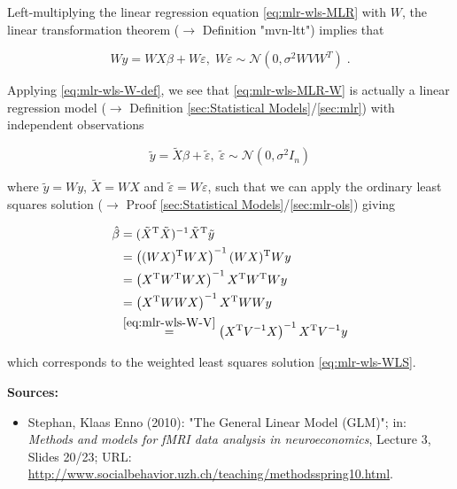 \documentclass[a4paper,12pt,twoside]{book}
\begin{document}
Left-multiplying the linear regression equation \eqref{eq:mlr-wls-MLR} with $W$, the linear transformation theorem ($\rightarrow$ Definition "mvn-ltt") implies that

\begin{equation} \label{eq:mlr-wls-MLR-W}
Wy = WX\beta + W\varepsilon, \; W\varepsilon \sim \mathcal{N}(0, \sigma^2 W V W^T) \; .
\end{equation}

Applying \eqref{eq:mlr-wls-W-def}, we see that \eqref{eq:mlr-wls-MLR-W} is actually a linear regression model ($\rightarrow$ Definition \ref{sec:Statistical Models}/\ref{sec:mlr}) with independent observations

\begin{equation} \label{eq:mlr-wls-MLR-W-dev}
\tilde{y} = \tilde{X}\beta + \tilde{\varepsilon}, \; \tilde{\varepsilon} \sim \mathcal{N}(0, \sigma^2 I_n)
\end{equation}

where $\tilde{y} = Wy$, $\tilde{X} = WX$ and $\tilde{\varepsilon} = W\varepsilon$, such that we can apply the ordinary least squares solution ($\rightarrow$ Proof \ref{sec:Statistical Models}/\ref{sec:mlr-ols}) giving

\begin{equation} \label{eq:mlr-wls-WLS-qed}
\begin{split}
\hat{\beta} &= (\tilde{X}^\mathrm{T} \tilde{X})^{-1} \tilde{X}^\mathrm{T} \tilde{y} \\
&= \left( (WX)^\mathrm{T} WX \right)^{-1} (WX)^\mathrm{T} Wy \\
&= \left( X^\mathrm{T} W^\mathrm{T} W X \right)^{-1} X^\mathrm{T} W^\mathrm{T} W y \\
&= \left( X^\mathrm{T} W W X \right)^{-1} X^\mathrm{T} W W y \\
&\overset{\eqref{eq:mlr-wls-W-V}}{=} \left( X^\mathrm{T} V^{-1} X \right)^{-1} X^\mathrm{T} V^{-1} y
\end{split}
\end{equation}

which corresponds to the weighted least squares solution \eqref{eq:mlr-wls-WLS}.


\vspace{1em}
\textbf{Sources:}
\begin{itemize}
\item Stephan, Klaas Enno (2010): "The General Linear Model (GLM)"; in: \textit{Methods and models for fMRI data analysis in neuroeconomics}, Lecture 3, Slides 20/23; URL: \url{http://www.socialbehavior.uzh.ch/teaching/methodsspring10.html}.
\end{itemize}
\end{document}
